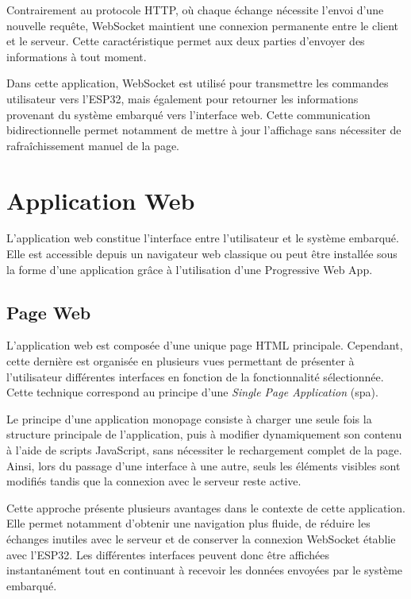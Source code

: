 Contrairement au protocole HTTP, où chaque échange nécessite l'envoi d'une nouvelle requête, WebSocket maintient une connexion permanente entre le client et le serveur. Cette caractéristique permet aux deux parties d'envoyer des informations à tout moment.

Dans cette application, WebSocket est utilisé pour transmettre les commandes utilisateur vers l'ESP32, mais également pour retourner les informations provenant du système embarqué vers l'interface web. Cette communication bidirectionnelle permet notamment de mettre à jour l'affichage sans nécessiter de rafraîchissement manuel de la page.

\section{Application Web}


L'application web constitue l'interface entre l'utilisateur et le système embarqué. Elle est accessible depuis un navigateur web classique ou peut être installée sous la forme d'une application grâce à l'utilisation d'une Progressive Web App.

\subsection{Page Web}


L'application web est composée d'une unique page HTML principale. Cependant, cette dernière est organisée en plusieurs vues permettant de présenter à l'utilisateur différentes interfaces en fonction de la fonctionnalité sélectionnée. Cette technique correspond au principe d'une \textit{Single Page Application} (\acrshort{spa}).

Le principe d'une application monopage consiste à charger une seule fois la structure principale de l'application, puis à modifier dynamiquement son contenu à l'aide de scripts JavaScript, sans nécessiter le rechargement complet de la page. Ainsi, lors du passage d'une interface à une autre, seuls les éléments visibles sont modifiés tandis que la connexion avec le serveur reste active.

Cette approche présente plusieurs avantages dans le contexte de cette application. Elle permet notamment d'obtenir une navigation plus fluide, de réduire les échanges inutiles avec le serveur et de conserver la connexion WebSocket établie avec l'ESP32. Les différentes interfaces peuvent donc être affichées instantanément tout en continuant à recevoir les données envoyées par le système embarqué.
